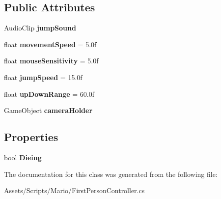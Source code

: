 \subsection*{Public Attributes}
\begin{DoxyCompactItemize}
\item 
\hypertarget{class_first_person_controller_ac921260baec703648233089633ffe753}{Audio\-Clip {\bfseries jump\-Sound}}\label{class_first_person_controller_ac921260baec703648233089633ffe753}

\item 
\hypertarget{class_first_person_controller_adfde22fc708117128d5ca126f5afd045}{float {\bfseries movement\-Speed} = 5.\-0f}\label{class_first_person_controller_adfde22fc708117128d5ca126f5afd045}

\item 
\hypertarget{class_first_person_controller_a9d77dbe9afeb1851ec65623828c70a55}{float {\bfseries mouse\-Sensitivity} = 5.\-0f}\label{class_first_person_controller_a9d77dbe9afeb1851ec65623828c70a55}

\item 
\hypertarget{class_first_person_controller_a55fe8994cf5254e74d9f71f89f402ca4}{float {\bfseries jump\-Speed} = 15.\-0f}\label{class_first_person_controller_a55fe8994cf5254e74d9f71f89f402ca4}

\item 
\hypertarget{class_first_person_controller_a237c14b938d7f81dd31d377bc5544cf7}{float {\bfseries up\-Down\-Range} = 60.\-0f}\label{class_first_person_controller_a237c14b938d7f81dd31d377bc5544cf7}

\item 
\hypertarget{class_first_person_controller_acd7cce673901ffcc78bf2d8b577cc98c}{Game\-Object {\bfseries camera\-Holder}}\label{class_first_person_controller_acd7cce673901ffcc78bf2d8b577cc98c}

\end{DoxyCompactItemize}
\subsection*{Properties}
\begin{DoxyCompactItemize}
\item 
\hypertarget{class_first_person_controller_a32644abe31d023420fc06964ff80d322}{bool {\bfseries Dieing}}\label{class_first_person_controller_a32644abe31d023420fc06964ff80d322}

\end{DoxyCompactItemize}


The documentation for this class was generated from the following file\-:\begin{DoxyCompactItemize}
\item 
Assets/\-Scripts/\-Mario/First\-Person\-Controller.\-cs\end{DoxyCompactItemize}
